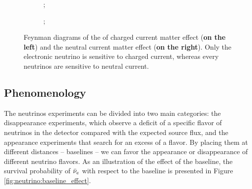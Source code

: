 \documentclass[../main.tex]{subfiles}
\begin{document}
\begin{figure}[ht]
  \centering
  \begin{subfigure}[t]{0.48\linewidth}
    \centering
    ;
  \end{subfigure}
  \begin{subfigure}[t]{0.48\linewidth}
    \centering
    ;
  \end{subfigure}
  \caption{Feynman diagrams of the of charged current matter effect (\textbf{on the left}) and the neutral current matter effect (\textbf{on the right}). Only the electronic neutrino is sensitive to charged current, whereas every neutrinos are sensitive to neutral current.}
  \label{fig:neutrinos:msw}
\end{figure}

\subsection{Phenomenology}
\label{sec:neutrino:pheno}

The neutrinos experiments can be divided into two main categories: the disappearance experiments, which observe a deficit of a specific flavor of neutrinos in the detector compared with the expected source flux, and the appearance experiments that search for an excess of a flavor. By placing them at different distances -- baselines -- we can favor the appearance or disappearance of different neutrino flavors. As an illustration of the effect of the baseline, the survival probability of $\bar{\nu}_{e}$ with respect to the baseline is presented in Figure \ref{fig:neutrino:baseline_effect}.
\end{document}

